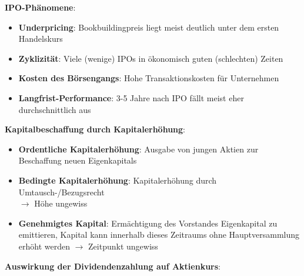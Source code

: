 \textbf{IPO-Phänomene}:
\begin{itemize}
	\item \textbf{Underpricing}: Bookbuildingpreis liegt meist deutlich unter dem ersten Handelskurs
	\item \textbf{Zyklizität}: Viele (wenige) IPOs in ökonomisch guten (schlechten) Zeiten
	\item \textbf{Kosten des Börsengangs}: Hohe Transaktionskosten für Unternehmen
	\item \textbf{Langfrist-Performance}: 3-5 Jahre nach IPO fällt meist eher durchschnittlich aus
\end{itemize}
\bigskip
\textbf{Kapitalbeschaffung durch Kapitalerhöhung}:
\begin{itemize}
	\item \textbf{Ordentliche Kapitalerhöhung}: Ausgabe von jungen Aktien zur Beschaffung neuen Eigenkapitals
	\item \textbf{Bedingte Kapitalerhöhung}: Kapitalerhöhung durch Umtausch-/Bezugsrecht\\ $\rightarrow$ Höhe ungewiss
	\item \textbf{Genehmigtes Kapital}: Ermächtigung des Vorstandes Eigenkapital zu emittieren, Kapital kann innerhalb dieses Zeitraums ohne Hauptversammlung erhöht werden 
	$\rightarrow$ Zeitpunkt ungewiss
\end{itemize}
\bigskip
\textbf{Auswirkung der Dividendenzahlung auf Aktienkurs}:
